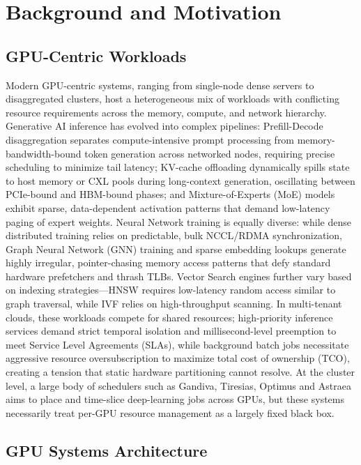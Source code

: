 \section{Background and Motivation}

\subsection{GPU-Centric Workloads}

Modern GPU-centric systems, ranging from single-node dense servers to disaggregated clusters, host a heterogeneous mix of workloads with conflicting resource requirements across the memory, compute, and network hierarchy. Generative AI inference has evolved into complex pipelines: Prefill-Decode disaggregation separates compute-intensive prompt processing from memory-bandwidth-bound token generation across networked nodes, requiring precise scheduling to minimize tail latency; KV-cache offloading dynamically spills state to host memory or CXL pools during long-context generation, oscillating between PCIe-bound and HBM-bound phases; and Mixture-of-Experts (MoE) models exhibit sparse, data-dependent activation patterns that demand low-latency paging of expert weights. Neural Network training is equally diverse: while dense distributed training relies on predictable, bulk NCCL/RDMA synchronization, Graph Neural Network (GNN) training and sparse embedding lookups generate highly irregular, pointer-chasing memory access patterns that defy standard hardware prefetchers and thrash TLBs. Vector Search engines further vary based on indexing strategies---HNSW requires low-latency random access similar to graph traversal, while IVF relies on high-throughput scanning. In multi-tenant clouds, these workloads compete for shared resources; high-priority inference services demand strict temporal isolation and millisecond-level preemption to meet Service Level Agreements (SLAs), while background batch jobs necessitate aggressive resource oversubscription to maximize total cost of ownership (TCO), creating a tension that static hardware partitioning cannot resolve. At the cluster level, a large body of schedulers such as Gandiva, Tiresias, Optimus and Astraea~\cite{gandiva,tiresias,optimus,astraea} aims to place and time-slice deep-learning jobs across GPUs, but these systems necessarily treat per-GPU resource management as a largely fixed black box.

\subsection{GPU Systems Architecture}

